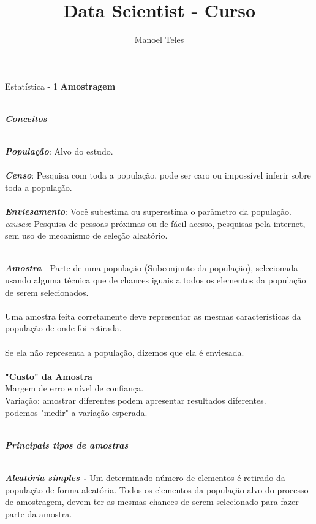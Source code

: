 \documentclass[12pt,a4paper]{article}
\begin{document}
	
\title{Data Scientist - Curso}
\author{Manoel Teles}

\maketitle

{\LARGE Estatística - 1}
\newline
\newline
\textbf{{\large Amostragem}}

\textbf{\textit{\\Conceitos}} 

\textbf{\textit{\\População}}: Alvo do estudo.
\textbf{\textit{\\\\Censo}}: Pesquisa com toda a população, pode ser caro ou impossível inferir sobre toda a população.
\textbf{\textit{\\\\Enviesamento}}: Você subestima ou superestima o parâmetro da população. 
\textit{causas}: Pesquisa de pessoas próximas ou de fácil acesso, pesquisas pela internet, sem uso de mecanismo de seleção aleatório.

\textbf{\textit{\\Amostra}} - Parte de uma população (Subconjunto da população), selecionada usando alguma técnica que de chances iguais a todos os elementos da população de serem selecionados. 
\\\\Uma amostra feita corretamente deve representar as mesmas características da população de onde foi retirada.
\\\\Se ela não representa a população, dizemos que ela é enviesada.
\textbf{\\\\"Custo" da Amostra}
\\Margem de erro e nível de confiança.
\\Variação: amostrar diferentes podem apresentar resultados diferentes.
\\podemos "medir" a variação esperada.

\newpage

\textbf{\textit{\\Principais tipos de amostras}} 

\textbf{\textit{\\Aleatória simples - }}
Um determinado número de elementos é retirado da população de forma aleatória.
Todos os elementos da população alvo do processo de amostragem, devem ter as mesmas chances 
de serem selecionado para fazer parte da amostra.
\end{document}
